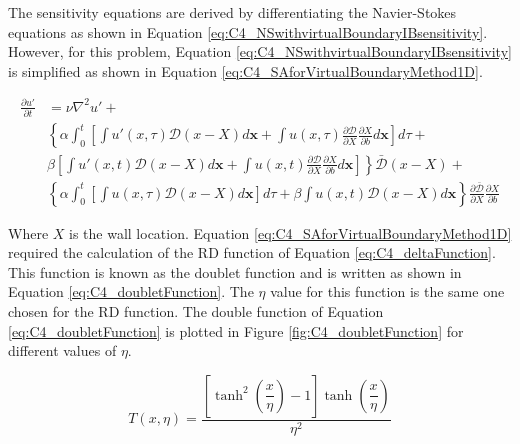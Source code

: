 The sensitivity equations are derived by differentiating the Navier-Stokes equations as shown in Equation \eqref{eq:C4_NSwithvirtualBoundaryIBsensitivity}. However, for this problem, Equation \eqref{eq:C4_NSwithvirtualBoundaryIBsensitivity} is simplified as shown in Equation \eqref{eq:C4_SAforVirtualBoundaryMethod1D}.

\begin{align}\label{eq:C4_SAforVirtualBoundaryMethod1D}
    \frac{\partial u'}{\partial t}
    &= 
    \nu \nabla^2 u' + \nonumber \\
    &\left\{
    \alpha
    \int_0^t
    \left[
        \int u'(x, \tau) \mathcal{D}(x - X) d\mathbf{x} + 
        \int u(x, \tau) \frac{\partial \mathcal{D}}{\partial X} \frac{\partial X}{\partial b} d\mathbf{x}
    \right] d\tau \right.
    + \nonumber \\
    &
    \left.
    \beta
    \left[
    \int u'(x, t) \mathcal{D}(x - X) d\mathbf{x} +
    \int u(x, t) \frac{\partial \mathcal{D}}{\partial X} \frac{\partial X}{\partial b} d\mathbf{x}
    \right]
    \right\} \bar{\mathcal{D}}(x - X) + \nonumber \\
    &\left\{
    \alpha
    \int_0^t
    \left[
        \int u(x, \tau) \mathcal{D}(x - X) d\mathbf{x}
    \right] d\tau
    +
    \beta
    \int u(x, t) \mathcal{D}(x - X) d\mathbf{x}
    \right\}
    \frac{\partial \bar{\mathcal{D}}}{\partial X} \frac{\partial X}{\partial b}
\end{align}

Where $X$ is the wall location. Equation \eqref{eq:C4_SAforVirtualBoundaryMethod1D} required the calculation of the RD function of Equation \eqref{eq:C4_deltaFunction}. This function is known as the doublet function \cite{kamaraju2009linear} and is written as shown in Equation \eqref{eq:C4_doubletFunction}. The $\eta$ value for this function is the same one chosen for the RD function. The double function of Equation \eqref{eq:C4_doubletFunction} is plotted in Figure \ref{fig:C4_doubletFunction} for different values of $\eta$.

\begin{equation}\label{eq:C4_doubletFunction}
    T(x, \eta) = 
    \frac{\left[ \tanh^{2}{\left(\dfrac{x}{\eta} \right)} - 1 \right] \tanh{\left( \dfrac{x}{\eta} \right)}}{\eta^2} 
\end{equation}

